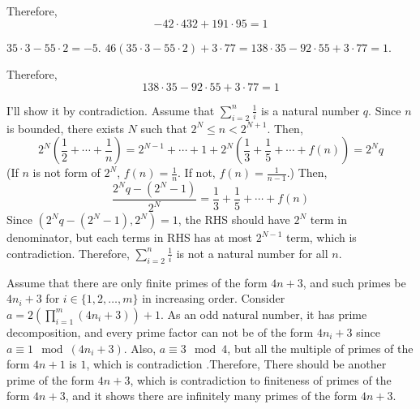 \documentclass[12pt]{article}
\newenvironment{problem}[2][Problem]{\begin{trivlist}
\item[\hskip \labelsep {\bfseries #1}\hskip \labelsep {\bfseries #2.}]}{\end{trivlist}}
\begin{document}
Therefore,
\begin{equation*}
    -42\cdot 432 + 191 \cdot 95=1
\end{equation*}
\begin{problem}{3}
\end{problem}
$35\cdot 3- 55\cdot 2=-5$. $46(35\cdot 3- 55\cdot 2)+3\cdot 77=138\cdot 35-92 \cdot 55+3\cdot 77=1$.

Therefore,
\begin{equation*}
138\cdot 35-92 \cdot 55+3\cdot 77=1
\end{equation*}

\begin{problem}{4}
\end{problem}
I'll show it by contradiction. Assume that $\sum\limits_{i=2}^n \frac{1}{i}$ is a natural number $q$. Since $n$ is bounded, there exists $N$ such that $2^N\leq n < 2^{N+1}$. Then,
\begin{equation*}
2^N\left(\frac{1}{2}+\cdots +\frac{1}{n}\right)=2^{N-1}+\cdots+1+2^N\left(\frac{1}{3}+\frac{1}{5}+\cdots + f(n)\right)=2^N q
\end{equation*}
(If $n$ is not form of $2^N$, $f(n)=\frac{1}{n}$. If not, $f(n)=\frac{1}{n-1}$.)
Then,
\begin{equation*}
\frac{2^N q-(2^{N}-1)}{2^N}=\frac{1}{3}+\frac{1}{5}+\cdots+f(n)
\end{equation*}
Since $(2^N q-(2^{N}-1), 2^N)=1$, the RHS should have $2^N$ term in denominator, but each terms in RHS has at most $2^{N-1}$ term, which is contradiction. Therefore, $\sum\limits_{i=2}^n \frac{1}{i}$ is not a natural number for all $n$.



\newpage
\begin{problem}{5}
\end{problem}
Assume that there are only finite primes of the form $4n+3$, and such primes be $4n_i+3$ for $i\in \{1, 2, \ldots, m\}$ in increasing order. Consider $a=2\left(\prod_{i=1}^m (4n_i+3)\right)+1$. As an odd natural number, it has prime decomposition, and every prime factor can not be of the form $4n_i+3$ since $a \equiv 1\mod (4n_i+3)$. Also, $a \equiv 3\mod 4$, but all the multiple of primes of the form $4n+1$ is $1$, which is contradiction .Therefore, There should be another prime of the form $4n+3$, which is contradiction to finiteness of primes of the form $4n+3$, and it shows there are infinitely many primes of the form $4n+3$.
\end{document}
